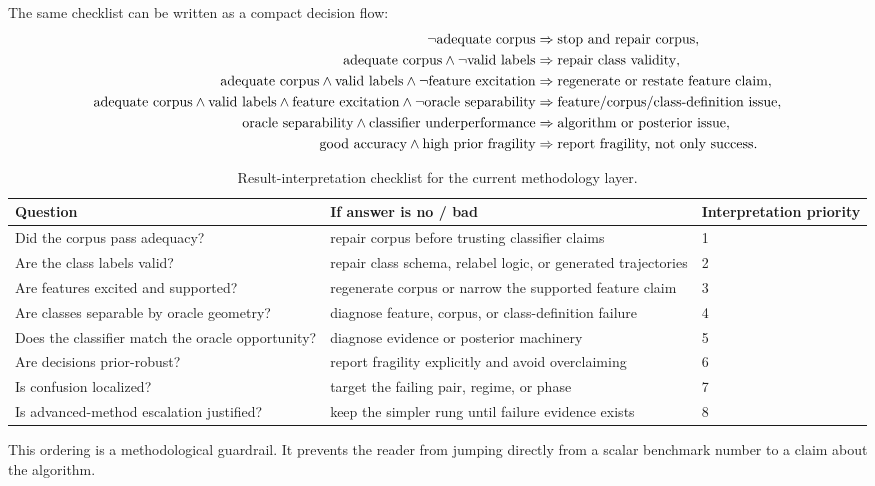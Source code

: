 \documentclass[11pt]{article}
\begin{document}
The same checklist can be written as a compact decision flow:
\begin{align}
\neg \text{adequate corpus}
&\Rightarrow
\text{stop and repair corpus},
\notag \\
\text{adequate corpus} \land \neg \text{valid labels}
&\Rightarrow
\text{repair class validity},
\notag \\
\text{adequate corpus} \land \text{valid labels} \land \neg \text{feature excitation}
&\Rightarrow
\text{regenerate or restate feature claim},
\notag \\
\text{adequate corpus} \land \text{valid labels} \land \text{feature excitation} \land \neg \text{oracle separability}
&\Rightarrow
\text{feature/corpus/class-definition issue},
\notag \\
\text{oracle separability} \land \text{classifier underperformance}
&\Rightarrow
\text{algorithm or posterior issue},
\notag \\
\text{good accuracy} \land \text{high prior fragility}
&\Rightarrow
\text{report fragility, not only success}.
\end{align}

\begin{table}[htbp]
\centering
\small
\caption{Result-interpretation checklist for the current methodology layer.}
\label{tab:result_interpretation_checklist}
\begin{tabularx}{\textwidth}{lXX}
\toprule
Question & If answer is no / bad & Interpretation priority \\
\midrule
Did the corpus pass adequacy? & repair corpus before trusting classifier claims & 1 \\
Are the class labels valid? & repair class schema, relabel logic, or generated trajectories & 2 \\
Are features excited and supported? & regenerate corpus or narrow the supported feature claim & 3 \\
Are classes separable by oracle geometry? & diagnose feature, corpus, or class-definition failure & 4 \\
Does the classifier match the oracle opportunity? & diagnose evidence or posterior machinery & 5 \\
Are decisions prior-robust? & report fragility explicitly and avoid overclaiming & 6 \\
Is confusion localized? & target the failing pair, regime, or phase & 7 \\
Is advanced-method escalation justified? & keep the simpler rung until failure evidence exists & 8 \\
\bottomrule
\end{tabularx}
\end{table}
This ordering is a methodological guardrail. It prevents the reader from
jumping directly from a scalar benchmark number to a claim about the algorithm.
\end{document}
